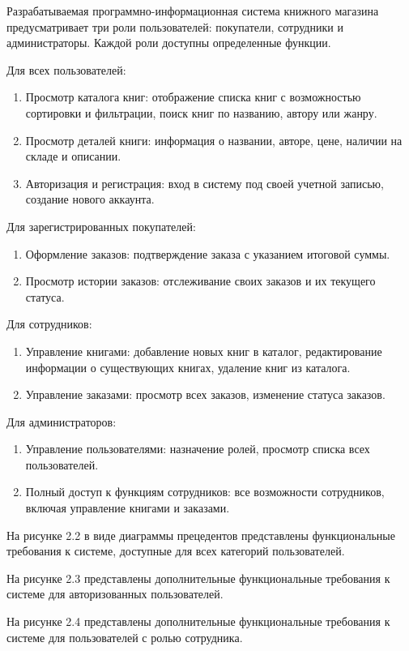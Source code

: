 Разрабатываемая программно-информационная система книжного магазина предусматривает три роли пользователей: покупатели, сотрудники и администраторы. Каждой роли доступны определенные функции.

Для всех пользователей:

\begin{enumerate}
	\item Просмотр каталога книг: отображение списка книг с возможностью сортировки и фильтрации, поиск книг по названию, автору или жанру.
	\item Просмотр деталей книги: информация о названии, авторе, цене, наличии на складе и описании.
	\item Авторизация и регистрация: вход в систему под своей учетной записью, создание нового аккаунта.
\end{enumerate}

Для зарегистрированных покупателей:
\begin{enumerate}
	\item Оформление заказов: подтверждение заказа с указанием итоговой суммы.
	\item Просмотр истории заказов: отслеживание своих заказов и их текущего статуса.
\end{enumerate}

Для сотрудников:
\begin{enumerate}
	\item Управление книгами: добавление новых книг в каталог, редактирование информации о существующих книгах, удаление книг из каталога.
	\item Управление заказами: просмотр всех заказов, изменение статуса заказов.
\end{enumerate}

Для администраторов:
\begin{enumerate}
	\item Управление пользователями: назначение ролей, просмотр списка всех пользователей.
	\item Полный доступ к функциям сотрудников: все возможности сотрудников, включая управление книгами и заказами.
\end{enumerate}

На рисунке 2.2 в виде диаграммы прецедентов представлены функциональные требования к системе, доступные для всех категорий пользователей.

На рисунке 2.3 представлены дополнительные функциональные требования к системе для авторизованных пользователей.

На рисунке 2.4 представлены дополнительные функциональные требования к системе для пользователей с ролью сотрудника.

